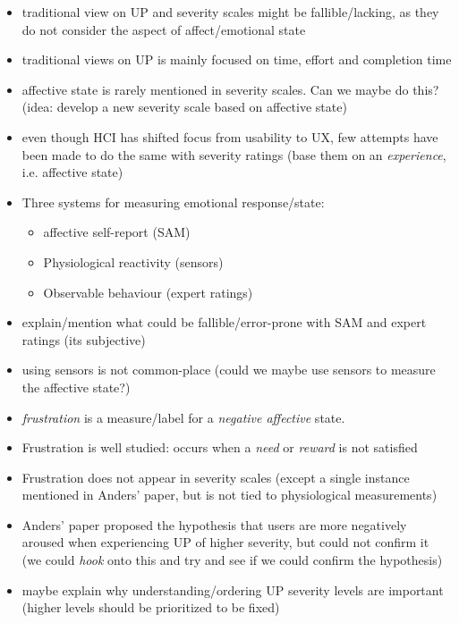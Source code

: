 \begin{itemize}
    \item traditional view on UP and severity scales might be fallible/lacking,
        as they do not consider the aspect of affect/emotional state
    \item traditional views on UP is mainly focused on time, effort and completion
        time
    \item affective state is rarely mentioned in severity scales. Can we maybe
        do this? (idea: develop a new severity scale based on affective state)
    \item even though HCI has shifted focus from usability to UX, few attempts have
        been made to do the same with severity ratings (base them on an
        \textit{experience}, i.e. affective state)
    \item Three systems for measuring emotional response/state:
        \begin{itemize}
            \item affective self-report (SAM)
            \item Physiological reactivity (sensors)
            \item Observable behaviour (expert ratings)
        \end{itemize}
    \item explain/mention what could be fallible/error-prone with SAM and expert
        ratings (its subjective)
    \item using sensors is not common-place (could we maybe use sensors to
        measure the affective state?)
    \item \textit{frustration} is a measure/label for a \textit{negative
        affective} state.
    \item Frustration is well studied: occurs when a \textit{need} or
        \textit{reward} is not satisfied
    \item Frustration does not appear in severity scales (except a single instance mentioned in Anders' paper, but is not tied to physiological measurements)
    \item Anders' paper proposed the hypothesis that users are more negatively
        aroused when experiencing UP of higher severity, but could not confirm
        it (we could \textit{hook}
        onto this and try and see if we could confirm the hypothesis)
    \item maybe explain why understanding/ordering UP severity levels are important
        (higher levels should be prioritized to be fixed)

\end{itemize}
